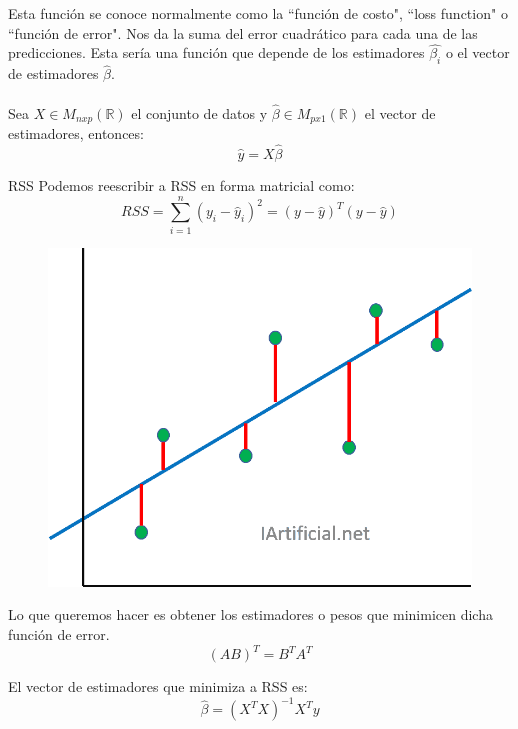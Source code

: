\documentclass[12pt,a4paper]{book}
\begin{document}
Esta función se conoce normalmente como la ``función de costo", ``loss function" o ``función de error". Nos da la suma del error cuadrático para cada una de las predicciones.
Esta sería una función que depende de los estimadores $\hat{\beta_i}$ o el vector de estimadores $\hat{\beta}$.\\
\\
Sea $X \in M_{nxp}\left(\mathbb{R}\right)$ el conjunto de datos y $\hat{\beta} \in M_{px1}\left(\mathbb{R}\right)$ el vector de estimadores, entonces:
$$\hat{y} = X\hat{\beta}$$
\begin{definicion}{RSS}{}
Podemos reescribir a RSS en forma matricial como:
$$RSS = \sum_{i = 1}^n (y_i - \hat{y}_i)^2 = (y-\hat{y})^T(y-\hat{y})$$
\end{definicion}
\begin{figure}[hbtp]
\centering
\includegraphics[scale=0.3]{Graficas/RL_2.png}
\caption{}
\end{figure}
Lo que queremos hacer es obtener los estimadores o pesos que minimicen dicha función de error.
$$(AB)^T=B^TA^T$$
\begin{proposicion}{}{}
El vector de estimadores que minimiza a RSS es:
$$\hat{\beta} = \left(X^TX\right)^{-1}X^Ty$$
\end{proposicion}
\end{document}
